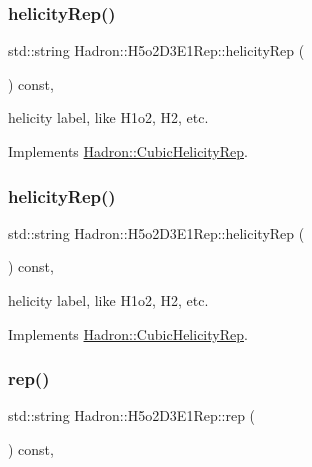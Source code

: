 \subsubsection{\texorpdfstring{helicityRep()}{helicityRep()}\hspace{0.1cm}{\footnotesize\ttfamily [2/3]}}
{\footnotesize\ttfamily std\+::string Hadron\+::\+H5o2\+D3\+E1\+Rep\+::helicity\+Rep (\begin{DoxyParamCaption}{ }\end{DoxyParamCaption}) const\hspace{0.3cm}{\ttfamily [inline]}, {\ttfamily [virtual]}}

helicity label, like H1o2, H2, etc. 

Implements \mbox{\hyperlink{structHadron_1_1CubicHelicityRep_af1096946b7470edf0a55451cc662f231}{Hadron\+::\+Cubic\+Helicity\+Rep}}.

\mbox{\label{structHadron_1_1H5o2D3E1Rep_a8b5b9e72ba3d6656c0c77e111bdd140a}} 
\subsubsection{\texorpdfstring{helicityRep()}{helicityRep()}\hspace{0.1cm}{\footnotesize\ttfamily [3/3]}}
{\footnotesize\ttfamily std\+::string Hadron\+::\+H5o2\+D3\+E1\+Rep\+::helicity\+Rep (\begin{DoxyParamCaption}{ }\end{DoxyParamCaption}) const\hspace{0.3cm}{\ttfamily [inline]}, {\ttfamily [virtual]}}

helicity label, like H1o2, H2, etc. 

Implements \mbox{\hyperlink{structHadron_1_1CubicHelicityRep_af1096946b7470edf0a55451cc662f231}{Hadron\+::\+Cubic\+Helicity\+Rep}}.

\mbox{\label{structHadron_1_1H5o2D3E1Rep_a08df80842b4ad843fc04e24eb3febd57}} 
\subsubsection{\texorpdfstring{rep()}{rep()}\hspace{0.1cm}{\footnotesize\ttfamily [1/5]}}
{\footnotesize\ttfamily std\+::string Hadron\+::\+H5o2\+D3\+E1\+Rep\+::rep (\begin{DoxyParamCaption}{ }\end{DoxyParamCaption}) const\hspace{0.3cm}{\ttfamily [inline]}, {\ttfamily [virtual]}}



